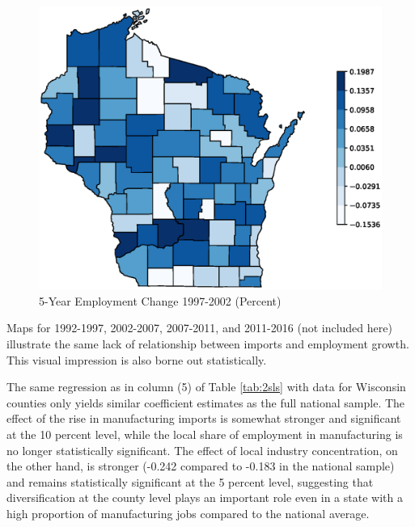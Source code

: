 \documentclass[onehalfspacing,11pt]{article}
\begin{document}
\begin{figure}
\begin{center}
\includegraphics[width=.95\textwidth]{d5log_emp_i_97_02-1.eps}
\caption{5-Year Employment Change 1997-2002 (Percent)}
\label{fig:d5emp}
\end{center}
\end{figure}
Maps for 1992-1997, 2002-2007, 2007-2011, and 2011-2016 (not included here) illustrate the same lack of relationship between imports and employment growth. This visual impression is also borne out statistically.

The same regression as in column (5) of Table \ref{tab:2sls} with data for Wisconsin counties only yields similar coefficient estimates as the full national sample. The effect of the rise in manufacturing imports is somewhat stronger and significant at the 10 percent level, while the local share of employment in manufacturing is no longer statistically significant. The effect of local industry concentration, on the other hand, is stronger (-0.242 compared to -0.183 in the national sample) and remains statistically significant at the 5 percent level, suggesting that diversification at the county level plays an important role even in a state with a high proportion of manufacturing jobs compared to the national average.
\end{document}

